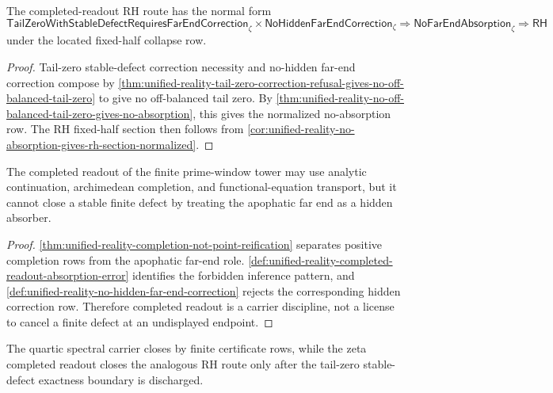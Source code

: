 \begin{theorem}
\label{thm:unified-reality-completed-readout-exactness-normal-form}
The completed-readout RH route has the normal form
$$
\mathsf{TailZeroWithStableDefectRequiresFarEndCorrection}_{\zeta}
\times
\mathsf{NoHiddenFarEndCorrection}_{\zeta}
\Rightarrow
\mathsf{NoFarEndAbsorption}_{\zeta}
\Rightarrow
\mathsf{RH}
$$
under the located fixed-half collapse row.
\end{theorem}

\begin{proof}
Tail-zero stable-defect correction necessity and no-hidden far-end
correction compose by
\autoref{thm:unified-reality-tail-zero-correction-refusal-gives-no-off-balanced-tail-zero}
to give no off-balanced tail zero.  By
\autoref{thm:unified-reality-no-off-balanced-tail-zero-gives-no-absorption},
this gives the normalized no-absorption row.  The RH fixed-half section
then follows from
\autoref{cor:unified-reality-no-absorption-gives-rh-section-normalized}.
\end{proof}

\begin{corollary}
\label{cor:unified-reality-completed-readout-no-far-end-reification}
The completed readout of the finite prime-window tower may use analytic
continuation, archimedean completion, and functional-equation transport,
but it cannot close a stable finite defect by treating the apophatic far
end as a hidden absorber.
\end{corollary}

\begin{proof}
\autoref{thm:unified-reality-completion-not-point-reification} separates
positive completion rows from the apophatic far-end role.
\autoref{def:unified-reality-completed-readout-absorption-error}
identifies the forbidden inference pattern, and
\autoref{def:unified-reality-no-hidden-far-end-correction} rejects the
corresponding hidden correction row.  Therefore completed readout is a
carrier discipline, not a license to cancel a finite defect at an
undisplayed endpoint.
\end{proof}

\begin{corollary}
\label{cor:unified-reality-quartic-comparison-completed-readout}
The quartic spectral carrier closes by finite certificate rows, while
the zeta completed readout closes the analogous RH route only after the
tail-zero stable-defect exactness boundary is discharged.
\end{corollary}

